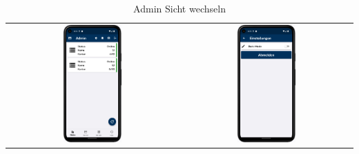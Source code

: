 \vspace{0.5cm}
\begin{table}[htbp]
  \centering
  \begin{tabular}{cc}
    \includegraphics[width=0.35\textwidth]{FLUTTER/images/ZB/status_page.png} & 
    \includegraphics[width=0.35\textwidth]{FLUTTER/images/ZB/settings_page.png} \\
  \end{tabular}
  \label{tab:example}
  \captionsetup{type=figure}
  \caption{Admin Sicht wechseln}
\end{table}

\newpage

